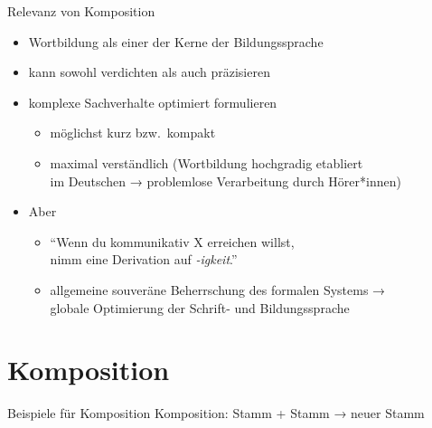 \begin{frame}
  {Relevanz von Komposition}
  \onslide<+->
  \begin{itemize}[<+->]
    \item Wortbildung als einer der Kerne der Bildungssprache
    \item kann sowohl \alert{verdichten} als auch \alert{präzisieren} 
    \Halbzeile
    \item komplexe Sachverhalte \alert{optimiert} formulieren
      \begin{itemize}[<+->]
        \item möglichst kurz bzw.\ kompakt
        \item maximal verständlich (Wortbildung hochgradig etabliert\\
          im Deutschen → problemlose Verarbeitung durch Hörer*innen)
      \end{itemize}
      \Halbzeile
    \item Aber 
      \Halbzeile
      \begin{itemize}[<+->]
        \item "`Wenn du kommunikativ X erreichen willst,\\
          nimm eine Derivation auf \textit{-igkeit}."' \onslide<+-> 
        \item \alert{allgemeine souveräne Beherrschung des formalen Systems →\\
          globale Optimierung der Schrift- und Bildungssprache}
      \end{itemize}
  \end{itemize}
\end{frame}

\section{Komposition}

\begin{frame}
  {Beispiele für Komposition}
  \onslide<+->
  Komposition: \alert{Stamm + Stamm → neuer Stamm}
  \Halbzeile
  \onslide<+->
  \begin{exe}
    \ex
    \begin{xlist}
      \onslide<+->
      \onslide<+->
      \onslide<+->
      \onslide<+->
      \onslide<+->
      \onslide<+->
      \onslide<+->
      \onslide<+->
    \end{xlist}
  \end{exe}
\end{frame}

